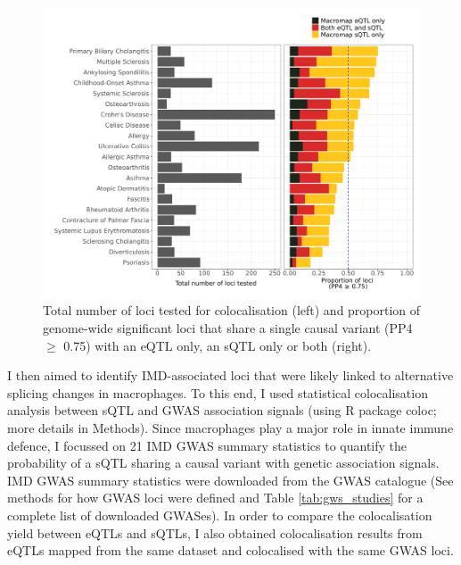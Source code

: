 \begin{figure}[H]
  \centering
  \includegraphics[width=\textwidth]{macromap_esqtl_total_loci}
  \caption[Colocalisation analysis results across 21 immune-mediated diseases]{Total number of loci tested for colocalisation (left) and proportion of genome-wide significant loci that share a single causal variant (PP4 $\geq$ 0.75) with an eQTL only, an sQTL only or both (right).}
  \label{fig:macromap_esqtl_total_loci}   
\end{figure}
I then aimed to identify IMD-associated loci that were likely linked to alternative splicing changes in macrophages. To this end, I used statistical colocalisation analysis between sQTL and GWAS association signals (using R package coloc; more details in Methods). Since macrophages play a major role in innate immune defence, I focussed on 21 IMD GWAS summary statistics to quantify the probability of a sQTL sharing a causal variant with genetic association signals. IMD GWAS summary statistics were downloaded from the GWAS catalogue \cite{Buniello2019-wb} (See methods for how GWAS loci were defined and Table \ref{tab:gws_studies} for a complete list of downloaded GWASes). In order to compare the colocalisation yield between eQTLs and sQTLs, I also obtained colocalisation results from eQTLs mapped from the same dataset and colocalised with the same GWAS loci.\\


